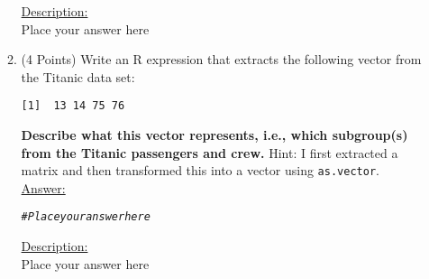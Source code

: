 \documentclass[12pt,letterpaper,final]{article}\usepackage[]{graphicx}\usepackage[]{xcolor}
\makeatletter
\newcommand{\hlcom}[1]{\textcolor[rgb]{0.678,0.584,0.686}{\textit{#1}}}%
\newenvironment{kframe}{%
 \def\at@end@of@kframe{}%
 \ifinner\ifhmode%
  \def\at@end@of@kframe{\end{minipage}}%
  \begin{minipage}{\columnwidth}%
 \fi\fi%
 \def\FrameCommand##1{\hskip\@totalleftmargin \hskip-\fboxsep
 \colorbox{shadecolor}{##1}\hskip-\fboxsep
     \hskip-\linewidth \hskip-\@totalleftmargin \hskip\columnwidth}%
 \MakeFramed {\advance\hsize-\width
   \@totalleftmargin\z@ \linewidth\hsize
   \@setminipage}}%
 {\par\unskip\endMakeFramed%
 \at@end@of@kframe}
\newenvironment{knitrout}{}{} %
\makeatother
\begin{document}
\begin{enumerate}
\begin{enumerate}
\underline{Description:} \\
Place your answer here


\item (4 Points)
Write an R expression that extracts the following vector from the Titanic data set:
\begin{verbatim}
[1]  13 14 75 76
\end{verbatim}
{\bf Describe what this vector represents, i.e., which subgroup(s) from the Titanic 
passengers and crew.}
Hint: I first extracted a matrix and then transformed this into a 
vector using \verb|as.vector|. \\

\underline{Answer:}
\begin{knitrout}
\color{fgcolor}\begin{kframe}
\begin{alltt}
\hlcom{# Place your answer here}
\end{alltt}
\end{kframe}
\end{knitrout}

\underline{Description:} \\
Place your answer here


\end{enumerate}


\end{enumerate}
\end{document}
